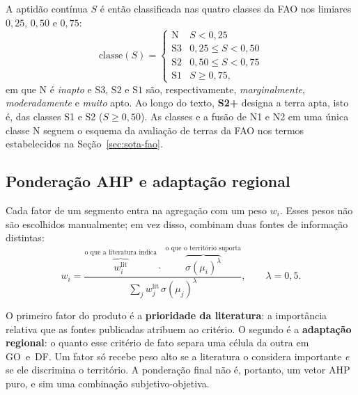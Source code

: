 A aptidão contínua $S$ é então classificada nas quatro classes da FAO nos limiares $0{,}25$,
$0{,}50$ e $0{,}75$:
\begin{equation*}
  \text{classe}(S) = \begin{cases}
   \mathrm{N}  & S < 0{,}25 \\
   \mathrm{S3} & 0{,}25 \le S < 0{,}50 \\
   \mathrm{S2} & 0{,}50 \le S < 0{,}75 \\
   \mathrm{S1} & S \ge 0{,}75,
\end{cases}
\end{equation*}
em que $\mathrm{N}$ é \emph{inapto} e $\mathrm{S3}$, $\mathrm{S2}$ e $\mathrm{S1}$ são,
respectivamente, \emph{marginalmente}, \emph{moderadamente} e \emph{muito} apto. Ao longo do texto,
\textbf{S2+} designa a terra apta, isto é, das classes S1 e S2 ($S \ge 0{,}50$). As classes e a fusão
de N1 e N2 em uma única classe N seguem o esquema da avaliação de terras da FAO nos termos
estabelecidos na Seção~\ref{sec:sota-fao}.

\subsection{Ponderação AHP e adaptação regional}\label{sec:ahp}

Cada fator de um segmento entra na agregação com um peso $w_i$. Esses pesos não são escolhidos
manualmente; em vez disso, combinam duas fontes de informação distintas:
\begin{equation*}
  w_i = \frac{\overbrace{w^{\mathrm{lit}}_i}^{\text{o que a literatura indica}}
              \cdot\;
              \overbrace{\sigma(\mu_i)^{\lambda}}^{\text{o que o território suporta}}}
             {\sum_j w^{\mathrm{lit}}_j \, \sigma(\mu_j)^{\lambda}},
  \qquad \lambda = 0{,}5 .
\end{equation*}

O primeiro fator do produto é a \textbf{prioridade da literatura}: a importância relativa que as
fontes publicadas atribuem ao critério. O segundo é a \textbf{adaptação regional}: o quanto esse
critério de fato separa uma célula da outra em GO~e~DF. Um fator só recebe peso alto se a
literatura o considera importante \emph{e} se ele discrimina o território. A ponderação final não é,
portanto, um vetor AHP puro, e sim uma combinação subjetivo-objetiva.

